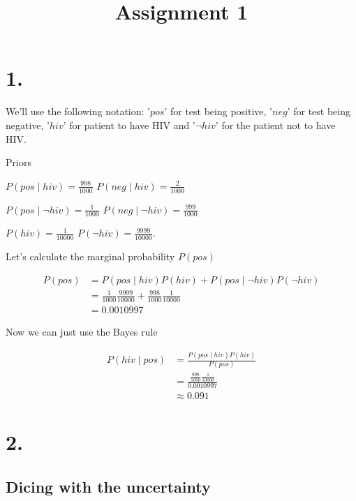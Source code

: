 \documentclass[11pt]{amsart}
\title{Assignment 1}
\begin{document}
\maketitle

\section*{1.}

We'll use the following notation: '$pos$' for test being positive, '$neg$' for test being negative, '$hiv$' for patient to have HIV and '$\neg hiv$' for the patient not to have HIV.

Priors

$P(pos \mid hiv) = \frac{998}{1000}$ $P(neg \mid hiv) = \frac{2}{1000}$

$P(pos \mid \neg hiv) = \frac{1}{1000}$ $P(neg \mid \neg hiv) = \frac{999}{1000}$

$P(hiv) = \frac{1}{10000}$ $P(\neg hiv) = \frac{9999}{10000}$.

Let's calculate the marginal probability $P(pos)$

\begin{equation*}
    \begin{aligned}
        P(pos) &= P(pos \mid hiv)P(hiv) + P(pos \mid \neg hiv)P(\neg hiv) \\
               &= \frac{1}{1000}\frac{9999}{10000} + \frac{998}{1000}\frac{1}{10000} \\
               &= 0.0010997
    \end{aligned}
\end{equation*}

Now we can just use the Bayes rule

\begin{equation*}
    \begin{aligned}
        P(hiv \mid pos)
        &= \frac{P(pos \mid hiv)P(hiv)}{P(pos)} \\
        &= \frac{\frac{998}{1000}\frac{1}{10000}}{0.0010997} \\
        &\approx 0.091
    \end{aligned}
\end{equation*}

\section*{2.}
\subsection*{Dicing with the uncertainty}
\end{document}
